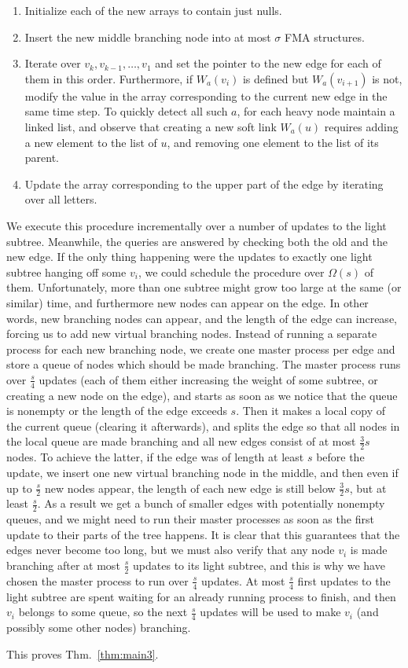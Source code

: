 \documentclass[11pt,onecolumn,final]{article} \usepackage{a4}
\theoremstyle{plain}
\theoremstyle{remark}
\begin{document}
\begin{enumerate}
\item Initialize each of the new arrays to contain just nulls.
\item Insert the new middle branching node into at most $\sigma$ FMA structures.
\item Iterate over $v_k,v_{k-1},\ldots,v_1$ and set the pointer to the new edge for each of them in this order. Furthermore, if $W_a(v_i)$ is defined but $W_a(v_{i+1})$ is not, modify the value in the array corresponding to the current new edge in the same time step. To quickly detect all such $a$, for each heavy node maintain a linked list, and observe that creating a new soft link $W_a(u)$ requires adding a new element to the list of $u$, and removing one element to the list of its parent.
\item Update the array corresponding to the upper part of the edge by iterating over all letters.
\end{enumerate}

We execute this procedure incrementally over a number of updates to the light subtree. Meanwhile, the queries are answered by checking both the old and the new edge. If the only thing happening were the updates to exactly one light subtree hanging off some $v_i$, we could schedule the procedure over $\Omega(s)$ of them. Unfortunately, more than one subtree might grow too large at the same (or similar) time, and furthermore new nodes can appear on the edge. In other words, new branching nodes can appear, and the length of the edge can increase, forcing us to add new virtual branching nodes. Instead of running a separate process for each new branching node, we create one master process per edge and store a queue of nodes which should be made branching. The master process runs over $\frac{s}{4}$ updates (each of them either increasing the weight of some subtree, or creating a new node on the edge), and starts as soon as we notice that the queue is nonempty or the length of the edge exceeds $s$. Then it makes a local copy of the current queue (clearing it afterwards), and splits the edge so that all nodes in the local queue are made branching and all new edges consist of at most $\frac{3}{2}s$ nodes. To achieve the latter, if the edge was of length at least $s$ before the update, we insert one new virtual branching node in the middle, and then even if up to $\frac{s}{2}$ new nodes appear, the length of each new edge is still below $\frac{3}{2}s$, but at least $\frac{s}{2}$. As a result we get a bunch of smaller edges with potentially nonempty queues, and we might need to run their master processes as soon as the first update to their parts of the tree happens. It is clear that this guarantees that the edges never become too long, but we must also verify that any node $v_i$ is made branching after at most $\frac{s}{2}$ updates to its light subtree, and this is why we have chosen the master process to run over $\frac{s}{4}$ updates. At most $\frac{s}{4}$ first updates to the light subtree are spent waiting for an already running process to finish, and then $v_i$ belongs to some queue, so the next $\frac{s}{4}$ updates will be used to make $v_i$ (and possibly some other nodes) branching.

This proves Thm.~\ref{thm:main3}.





\end{document}
